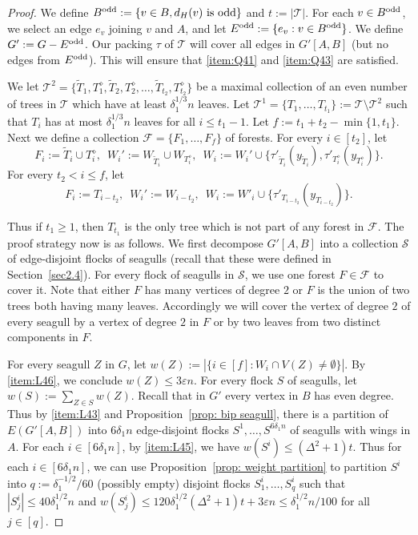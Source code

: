 \documentclass[a4paper, 11pt, reqno]{amsart}
\numberwithin{equation}{section}
\newcommand{\1}{{\rm 1\hspace*{-0.4ex}%
\rule{0.1ex}{1.52ex}\hspace*{0.2ex}}}
\newcommand{\es}{\emptyset}
\newcommand{\cS}{\mathcal{S}}
\newcommand{\cF}{\mathcal{F}}
\newcommand{\cT}{\mathcal{T}}
\renewcommand{\epsilon}{\varepsilon}
\newcommand{\sm}{\setminus}
\newcommand{\COMMENT}[1]{}
\begin{document}
\begin{proof}
We define 
$B^{\rm odd} := \{v \in B, d_{H}(v) \text{ is odd}\}$ and $t:=|\cT|$.
For each $v\in B^{\rm odd}$, we select an edge $e_v$ joining $v$ and $A$, 
and let $E^{\rm odd}:=\{e_v : v\in B^{\rm odd}\}$. 
We define $G':=G-E^{\rm odd}$.
Our packing $\tau$ of $\cT$ will cover all edges in $G'[A,B]$ (but no edges from $E^{\rm odd}$).
This will ensure that \ref{item:Q41} and \ref{item:Q43} are satisfied.

We let $\cT^2=\{ \tilde{T}_1, T^{\diamond}_1, \tilde{T}_2, T^{\diamond}_2,\dots, \tilde{T}_{t_2}, T^{\diamond}_{t_2}\}$ be a maximal collection of an even number of trees in $\cT$ which have at least $\delta_1^{1/3} n$ leaves.
Let $\cT^{1}=\{ T_1,\dots, T_{t_1}\}:=\cT\sm \cT^2$ such that $T_i$ has at most $\delta_1^{1/3} n$ leaves for all $i\leq t_1-1$. 
Let $f:= t_1+t_2-\min\{1,t_1\}$.
Next we define a collection $\cF=\{F_1,\ldots,F_f\}$ of forests.
For every $i\in [t_2]$, let
$$F_i:= \tilde{T}_{i} \cup T^{\diamond}_{i}, \enspace W_i':= W_{\tilde{T}_{i}}\cup W_{T^{\diamond}_{i}}, 
\enspace W_i:= W_i' \cup \{\tau'_{\tilde{T}_{i}}(y_{\tilde{T}_{i}}), \tau'_{T^{\diamond}_{i}}(y_{{T}_i^{\diamond}}) \}.$$
For every $t_2< i\leq f$, let
$$F_i:= T_{i-t_2}, \enspace W_i':=W_{i-t_2}, \enspace W_i := W'_i \cup \{\tau'_{T_{i-t_2}}(y_{T_{i-t_2}})\}.$$

Thus if $t_1\geq 1$, then $T_{t_1}$ is the only tree which is not part of any forest in $\cF$.
The proof strategy now is as follows.
We first decompose $G'[A,B]$ into a collection $\cS$ of edge-disjoint flocks of seagulls (recall that these were defined in Section~\ref{sec2.4}).
For every flock of seagulls in $\cS$, 
we use one forest $F\in\cF$ to cover it.
Note that either $F$ has many vertices of degree $2$
or $F$ is the union of two trees both having many leaves.
Accordingly we will cover the vertex of degree $2$ of every seagull by a vertex of degree $2$ in $F$
or by two leaves from two distinct components in $F$.

For every seagull $Z$ in $G$, let $w(Z):=|\{i\in [f]: W_i\cap V(Z)\neq \es\}|$.
By \ref{item:L46}, we conclude $w(Z)\leq 3\epsilon n$.
For every flock $S$ of seagulls, let $w(S) := \sum_{Z\in S} w(Z)$.
Recall that in $G'$ every vertex in $B$ has even degree.
Thus by \ref{item:L43} and Proposition~\ref{prop: bip seagull}, there is a partition of $E(G'[A,B])$ into $6\delta_1 n$ edge-disjoint flocks $S^1,\dots, S^{6\delta_1 n}$ of seagulls with wings in $A$. 
For each $i\in [6\delta_1 n]$, by \ref{item:L45},
we have $w(S^i) \leq (\Delta^2+1)t$.\COMMENT{$w(S_i) \leq \sum_{v\in V(G)}w(v) = \sum_{T\in \cT} |W_{T}\cup \{y_T\}| \leq (\Delta^2+1)|\cT|$.}
Thus for each $i\in [6\delta_1 n]$, we can use Proposition~\ref{prop: weight partition} to partition $S^i$ into 
$q:=\delta_1^{-1/2}/60$ (possibly empty) disjoint flocks $S^i_1,\dots, S^i_{q}$ 
such that $|S^i_{j}|\leq 40\delta_1^{1/2}n$ and $w(S^i_j) \leq 120\delta_1^{1/2}(\Delta^2+1)t + 3\epsilon n \leq \delta_1^{1/2}n/100$
for all $j\in[q]$. 


\end{proof}
\end{document}

